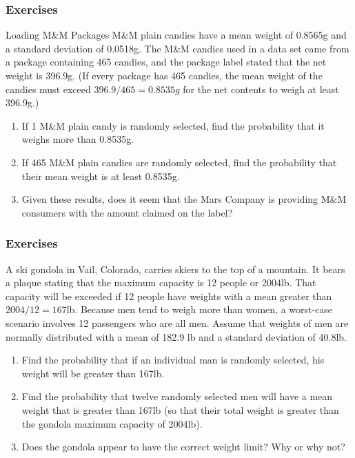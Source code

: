 \documentclass[xcolor=dvipsnames]{beamer}
\begin{document}
\begin{frame}
  \frametitle{Exercises}
  {\ubung} Loading M\&M Packages M\&M plain candies have a mean weight
  of 0.8565g and a standard deviation of 0.0518g. The M\&M candies
  used in a data set came from a package containing 465 candies, and
  the package label stated that the net weight is 396.9g. (If every
  package has 465 candies, the mean weight of the candies must exceed
  $396.9/465=0.8535g$ for the net contents to weigh at least 396.9g.)
  \begin{enumerate}
  \item If 1 M\&M plain candy is randomly selected, find the
    probability that it weighs more than 0.8535g.
  \item If 465 M\&M plain candies are randomly selected, find the
    probability that their mean weight is at least 0.8535g.
  \item Given these results, does it seem that the Mars Company is
    providing M\&M consumers with the amount claimed on the label?
  \end{enumerate}
\end{frame}

\begin{frame}
  \frametitle{Exercises} 
  {\ubung} A ski gondola in Vail, Colorado, carries skiers to the top
  of a mountain. It bears a plaque stating that the maximum capacity
  is 12 people or 2004lb. That capacity will be exceeded if 12 people
  have weights with a mean greater than $2004/12=167$lb. Because men
  tend to weigh more than women, a worst-case scenario involves 12
  passengers who are all men. Assume that weights of men are normally
  distributed with a mean of 182.9 lb and a standard deviation of
  40.8lb.
  \begin{enumerate}
  \item Find the probability that if an individual man is randomly
    selected, his weight will be greater than 167lb.
  \item Find the probability that twelve randomly selected men
    will have a mean weight that is greater than 167lb (so that their
    total weight is greater than the gondola maximum capacity of
    2004lb).
  \item Does the gondola appear to have the correct weight limit?
    Why or why not?
  \end{enumerate}
\end{frame}
\end{document}
